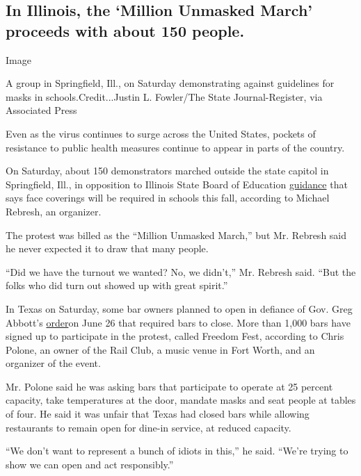 \hypertarget{in-illinois-the-million-unmasked-march-proceeds-with-about-150-people}{%
\subsection{In Illinois, the `Million Unmasked March' proceeds with
about 150
people.}\label{in-illinois-the-million-unmasked-march-proceeds-with-about-150-people}}

Image

A group in Springfield, Ill., on Saturday demonstrating against
guidelines for masks in schools.Credit...Justin L. Fowler/The State
Journal-Register, via Associated Press

Even as the virus continues to surge across the United States, pockets
of resistance to public health measures continue to appear in parts of
the country.

On Saturday, about 150 demonstrators marched outside the state capitol
in Springfield, Ill., in opposition to Illinois State Board of Education
\href{https://www.isbe.net/Documents/FAQ-Part-3-Transition-Guidance.pdf}{guidance}
that says face coverings will be required in schools this fall,
according to Michael Rebresh, an organizer.

The protest was billed as the ``Million Unmasked March,'' but Mr.
Rebresh said he never expected it to draw that many people.

``Did we have the turnout we wanted? No, we didn't,'' Mr. Rebresh said.
``But the folks who did turn out showed up with great spirit.''

In Texas on Saturday, some bar owners planned to open in defiance of
Gov. Greg Abbott's
\href{https://gov.texas.gov/news/post/governor-abbott-takes-executive-action-to-contain-spread-of-covid-19}{order}on
June 26 that required bars to close. More than 1,000 bars have signed up
to participate in the protest, called Freedom Fest, according to Chris
Polone, an owner of the Rail Club, a music venue in Fort Worth, and an
organizer of the event.

Mr. Polone said he was asking bars that participate to operate at 25
percent capacity, take temperatures at the door, mandate masks and seat
people at tables of four. He said it was unfair that Texas had closed
bars while allowing restaurants to remain open for dine-in service, at
reduced capacity.

``We don't want to represent a bunch of idiots in this,'' he said.
``We're trying to show we can open and act responsibly.''

